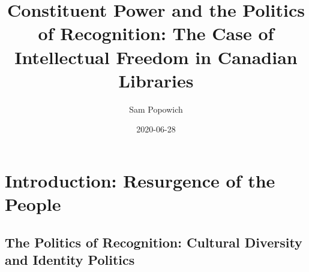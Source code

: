 \documentclass[12pt,oneside]{memoir}
\title{Constituent Power and the Politics of Recognition: The Case of Intellectual Freedom in Canadian Libraries}
\author{Sam Popowich}
\date{2020-06-28}
\begin{document}
\maketitle
\clearpage


\tableofcontents


\newpage
\setcounter{page}{1}

\mainmatter

\chapter{Introduction: Resurgence of the People}
\label{scrivauto:5}

\section{The Politics of Recognition: Cultural Diversity and Identity Politics}
\label{scrivauto:6}
\end{document}

